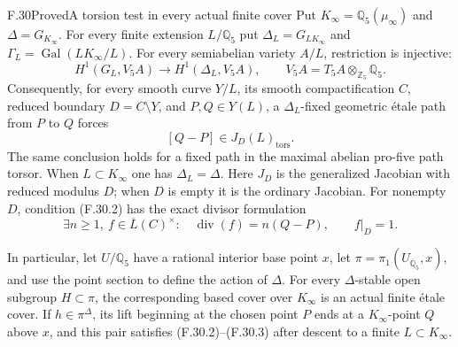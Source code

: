 \begin{statement}{F.30}{Proved}{A torsion test in every actual finite cover}
Put $K_\infty=\mathbb Q_5(\mu_\infty)$ and
$\Delta=G_{K_\infty}$.
For every finite extension $L/\mathbb Q_5$ put
$\Delta_L=G_{LK_\infty}$ and
$\Gamma_L=\operatorname{Gal}(LK_\infty/L)$.
For every semiabelian variety $A/L$,
restriction is injective:
\[
 H^1(G_L,V_5A)\longrightarrow
 H^1(\Delta_L,V_5A),\qquad
 V_5A=T_5A\otimes_{\mathbb Z_5}\mathbb Q_5.
                                                        \tag{F.30.1}
\]
Consequently, for every smooth curve $Y/L$, its smooth
compactification $C$, reduced boundary $D=C\setminus Y$,
and $P,Q\in Y(L)$, a $\Delta_L$-fixed geometric
\'etale path from $P$ to $Q$ forces
\[
                 [Q-P]\in J_D(L)_{\mathrm{tors}}.
                                                        \tag{F.30.2}
\]
The same conclusion holds for a fixed path in the
maximal abelian pro-five path torsor.
When $L\subset K_\infty$ one has $\Delta_L=\Delta$.
Here $J_D$ is the generalized Jacobian with reduced
modulus $D$; when $D$ is empty it is the ordinary Jacobian.
For nonempty $D$, condition (F.30.2) has the exact
divisor formulation
\[
 \exists n\geq1,\ f\in\overline L(C)^\times:
 \quad \operatorname{div}(f)=n(Q-P),\qquad f|_D=1.
                                                        \tag{F.30.3}
\]

In particular, let $U/\mathbb Q_5$ have a rational
interior base point $x$, let
$\pi=\pi_1(U_{\overline{\mathbb Q}_5},x)$, and use
the point section to define the action of $\Delta$.
For every $\Delta$-stable open subgroup $H\subset\pi$,
the corresponding based cover over $K_\infty$ is an
actual finite \'etale cover.  If $h\in\pi^\Delta$,
its lift beginning at the chosen point $P$ ends at
a $K_\infty$-point $Q$ above $x$, and this pair satisfies
(F.30.2)--(F.30.3) after descent to a finite
$L\subset K_\infty$.
\end{statement}


